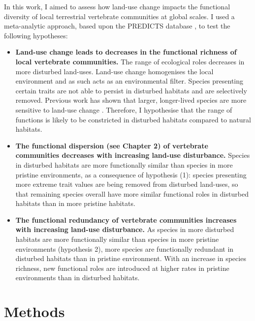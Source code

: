 In this work, I aimed to assess how land-use change impacts the functional diversity of local terrestrial vertebrate communities at global scales. I used a meta-analytic approach, based upon the PREDICTS database \citep{Hudson2014, Hudson2017}, to test the following hypotheses:
\begin{itemize}
\item \textbf{Land-use change leads to decreases in the functional richness of local vertebrate communities.} The range of ecological roles decreases in more disturbed land-uses. Land-use change homogenises the local environment and as such acts as an environmental filter. Species presenting certain traits are not able to persist in disturbed habitats and are selectively removed. Previous work has shown that larger, longer-lived species are more sensitive to land-use change \citep{Newbold2013}. Therefore, I hypothesise that the range of functions is likely to be constricted in disturbed habitats compared to natural habitats. 
\item \textbf{The functional dispersion (see Chapter 2) of vertebrate communities decreases with increasing land-use disturbance.} Species in disturbed habitats are more functionally similar than species in more pristine environments, as a consequence of hypothesis (1): species presenting more extreme trait values are being removed from disturbed land-uses, so that remaining species overall have more similar functional roles in disturbed habitats than in more pristine habitats. 
\item\textbf{The functional redundancy of vertebrate communities increases with increasing land-use disturbance.} As species in more disturbed habitats are more functionally similar than species in more pristine environments (hypothesis 2), more species are functionally redundant in disturbed habitats than in pristine environment. With an increase in species richness, new functional roles are introduced at higher rates in pristine environments than in disturbed habitats. 
\end{itemize}


\section{Methods}

